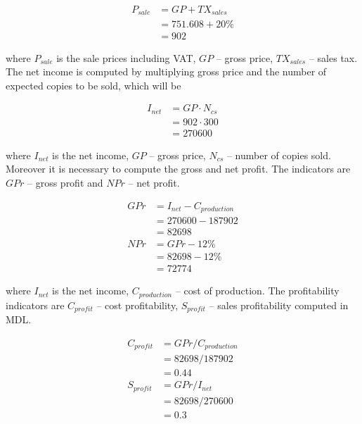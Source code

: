 \begin{equation}
 \begin{split}
  P_{sale} &= GP + TX_{sales}\\
              &= 751.608 + 20\% \\
              &= 902
 \end{split}
\end{equation}

\noindent
where $P_{sale}$ is the sale prices including VAT, $GP$ -- gross price, $TX_{sales}$ -- sales tax. The net income is computed by multiplying gross price and the number of expected copies to be sold, which will be

\begin{equation}
 \begin{split}
  I_{net} &= GP \cdot N_{cs}\\
              &= 902  \cdot 300 \\
              &= 270600
 \end{split}
\end{equation}

\noindent
where $I_{net}$ is the net income, $GP$ -- gross price, $N_{cs}$ -- number of copies sold. Moreover it is necessary to compute the gross and net profit. The indicators are $GPr$ -- gross profit and $NPr$ -- net profit.

\begin{equation}
 \begin{split}
  GPr &= I_{net} - C_{production}\\
              &= 270600 - 187902\\
              &= 82698\\
  NPr &= GPr - 12\% \\
             &= 82698 - 12\% \\
             &= 72774
 \end{split}
\end{equation}

\noindent
where $I_{net}$ is the net income, $C_{production}$ -- cost of production. The profitability indicators are $C_{profit}$ -- cost profitability, $S_{profit}$ -- sales profitability computed in MDL.

\begin{equation}
 \begin{split}
  C_{profit} &= GPr / C_{production}\\
              &= 82698 / 187902\\
              &= 0.44 \\         
  S_{profit} &= GPr / I_{net}\\
             &= 82698 / 270600\\
             &= 0.3\\
 \end{split}
\end{equation}


